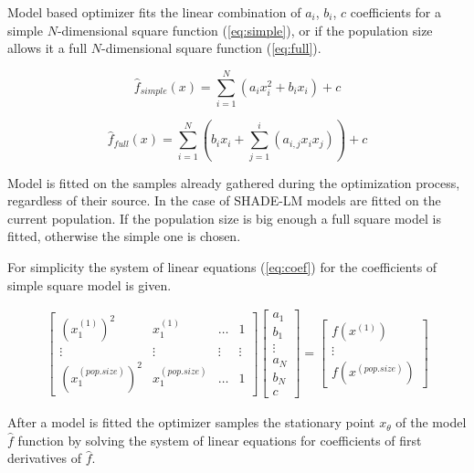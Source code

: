 \documentclass[sigconf]{acmart}
\begin{document}
Model based optimizer fits the linear combination
of $a_i$, $b_i$, $c$ coefficients for a simple
$N$-dimensional square function (\ref{eq:simple}), or if the population
size allows it a full $N$-dimensional square function (\ref{eq:full}).

\begin{equation}
	\hat{f}_{simple}(x) = \sum\limits_{i=1}^{N}(a_ix_i^2 + b_ix_i) + c
	\label{eq:simple}
\end{equation}

\begin{equation}
	\hat{f}_{full}(x) = \sum\limits_{i=1}^{N} \left( b_ix_i + \sum\limits_{j=1}^{i}(a_{i,j}x_ix_j )\right) + c
	\label{eq:full}
\end{equation}

Model is fitted on the samples already gathered during the optimization process,
regardless of their source.
In the case of SHADE-LM models are fitted on the current population.
If the population size is big enough a full square model is fitted,
otherwise the simple one is chosen.

For simplicity the system of linear equations (\ref{eq:coef}) for the coefficients of simple square model is given.

\begin{align}
	\begin{bmatrix}
		(x^{(1)}_1)^2 & x^{(1)}_1 &  \ldots & 1 \\           
   \vdots & \vdots  & \vdots &  \vdots  \\
   (x^{(pop.size)}_1)^2 & x^{(pop.size)}_1 & \ldots & 1
  \end{bmatrix} 
  \begin{bmatrix}
	a_{1} \\           
	b_{1} \\           
	\vdots \\
	a_{N} \\           
	b_{N} \\           
	c
   \end{bmatrix}
	=
	\begin{bmatrix}
		f(x^{(1)}) \\           
		\vdots \\
		f(x^{(pop.size)})
	   \end{bmatrix}
	 \label{eq:coef}
\end{align}


After a model is fitted the optimizer samples the stationary point $x_\theta$
of the model $\hat{f}$ function by solving the system of linear equations for coefficients of first derivatives of $\hat{f}$.
\end{document}
